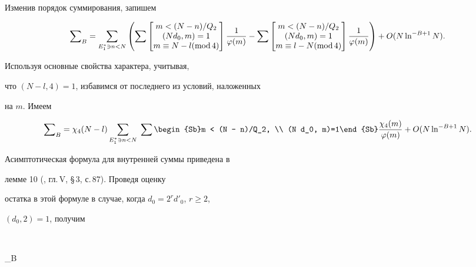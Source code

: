 Изменив порядок суммирования, запишем


$$


\sum\nolimits_B


= \sum_{E^*_1 \ni n < N} \left( \sum


\begin{bmatrix}


m < (N - n)/Q_2\\ (N d_0, m)=1\\ m \equiv N - l (\Mod 4)


\end{bmatrix}


\frac1{\varphi(m)}


- \sum


\begin{bmatrix}


m < (N - n)/Q_2\\ (N d_0, m)=1\\ m \equiv l - N (\Mod 4)


\end{bmatrix} \frac1{\varphi(m)} \right)


+ O ( N \ln^{-B+1} N ).


$$


\noindent Используя основные свойства характера, учитывая,


что $(N-l,4)=1$, избавимся от последнего из условий, наложенных


на $m$. Имеем


$$


\sum\nolimits_B


= \chi_4(N-l) \sum_{E^*_1 \ni n < N}\; \sum\begin{Sb}m < (N - n)/Q_2,


\\ (N d_0, m)=1\end{Sb} \frac{\chi_4(m)}{\varphi(m)}


+ O ( N \ln^{-B+1} N ).


$$





Асимптотическая формула для внутренней суммы приведена в


лемме 10 (\cite{hooli}, гл.\,V, \S\,3, с.\,87). Проведя оценку


остатка в этой формуле в случае, когда $d_0 = 2^r d'_0$, $r \ge 2$,


$(d_0, 2)=1$, получим


$$


\sum\nolimits_B


